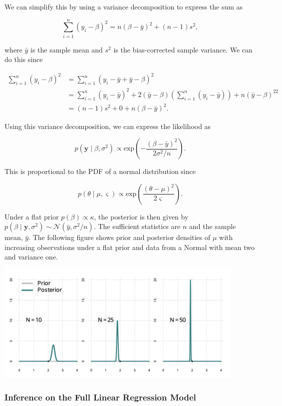 We can simplify this by using a variance decomposition to express the sum as

\[
	\sum^n_{i=1}(y_i-\beta)^2 = n(\beta-\bar{y})^2+(n-1)s^2,
\]

where $\bar{y}$ is the sample mean and $s^2$ is the bias-corrected sample variance. We can do this since

\begin{align*}
	\sum^n_{i=1}(y_i-\beta)^2 &= \sum^n_{i=1} (y_i-\bar{y}+\bar{y}-\beta)^2 \\
	&= \sum^n_{i=1}(y_i-\bar{y})^2+2(\bar{y}-\beta)\left(\sum^n_{i=1}(y_i-\bar{y})\right) + n(\bar{y}-\beta)^22 \\
	&=(n-1)s^2+0+n(\beta-\bar{y})^2.
\end{align*}

Using this variance decomposition, we can express the likelihood as

\[
	p(\bm{y}\mid\beta,\sigma^2) \propto \mathrm{exp}\left(-\frac{(\beta-\bar{y})^2}{2\sigma^2/n}\right). 
\]

This is proportional to the PDF of a normal distribution since

\[
	p(\theta\mid\mu,\varsigma) \propto \mathrm{exp}\left(\frac{(\theta-\mu)^2}{2\varsigma}\right).
\]

Under a flat prior $p(\beta) \propto \kappa$, the posterior is then given by $p(\beta\mid\bm{y},\sigma^2)\sim\mathcal{N}(\bar{y},\sigma^2/n)$. The sufficient statistics are $n$ and the sample mean, $\bar{y}$. The following figure shows prior and posterior densities of $\mu$ with increasing observations under a flat prior and data from a Normal with mean two and variance one.

\begin{center}
	\includegraphics[width = 12cm]{normal.png}
\end{center}

\subsubsection{Inference on the Full Linear Regression Model}

